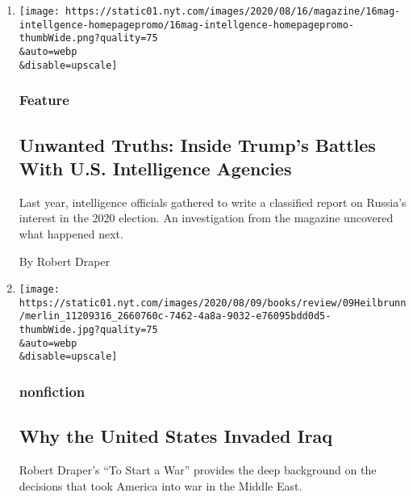 \begin{enumerate}
\def\labelenumi{\arabic{enumi}.}
\item
  \href{/2020/08/08/magazine/us-russia-intelligence.html}{}

  \texttt{[image: https://static01.nyt.com/images/2020/08/16/magazine/16mag-intellgence-homepagepromo/16mag-intellgence-homepagepromo-thumbWide.png?quality=75\\\&auto=webp\\\&disable=upscale]}

  \hypertarget{feature}{%
  \subsubsection{Feature}\label{feature}}

  \hypertarget{unwanted-truths-inside-trumps-battles-with-us-intelligence-agencies}{%
  \subsection{Unwanted Truths: Inside Trump's Battles With U.S.
  Intelligence
  Agencies}\label{unwanted-truths-inside-trumps-battles-with-us-intelligence-agencies}}

  Last year, intelligence officials gathered to write a classified
  report on Russia's interest in the 2020 election. An investigation
  from the magazine uncovered what happened next.

  By Robert Draper
\item
  \href{/2020/07/28/books/review/to-start-a-war-robert-draper.html}{}

  \texttt{[image: https://static01.nyt.com/images/2020/08/09/books/review/09Heilbrunn/merlin\_11209316\_2660760c-7462-4a8a-9032-e76095bdd0d5-thumbWide.jpg?quality=75\\\&auto=webp\\\&disable=upscale]}

  \hypertarget{nonfiction}{%
  \subsubsection{nonfiction}\label{nonfiction}}

  \hypertarget{why-the-united-states-invaded-iraq}{%
  \subsection{Why the United States Invaded
  Iraq}\label{why-the-united-states-invaded-iraq}}

  Robert Draper's ``To Start a War'' provides the deep background on the
  decisions that took America into war in the Middle East.


\end{enumerate}

